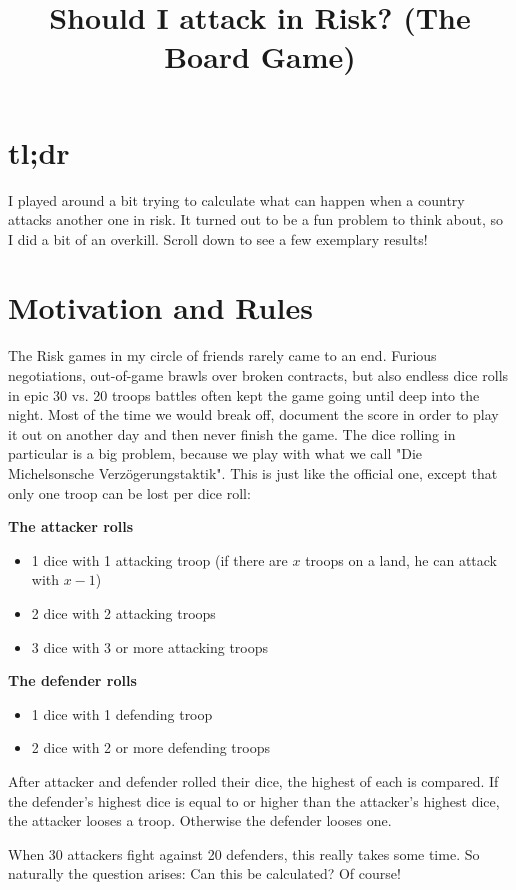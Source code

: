 \documentclass[11pt,a4paper]{article}
\title{Should I attack in Risk? (The Board Game)}
\author{}
\date{}
\begin{document}
\maketitle

\section*{tl;dr}
I played around a bit trying to calculate what can happen when a country attacks another one in risk. It turned out to be a fun problem to think about, so I did a bit of an overkill. Scroll down to see a few exemplary results!

\section{Motivation and Rules}
The Risk games in my circle of friends rarely came to an end. Furious negotiations, out-of-game brawls over broken contracts, but also endless dice rolls in epic 30 vs. 20 troops battles often kept the game going until deep into the night. Most of the time we would break off, document the score in order to play it out on another day and then never finish the game. The dice rolling in particular is a big problem, because we play with what we call "Die Michelsonsche Verzögerungstaktik". This is just like the official one, except that only one troop can be lost per dice roll:

\textbf{The attacker rolls}
\begin{itemize}
\item 1 dice with 1 attacking troop (if there are $x$ troops on a land, he can attack with $x-1$)
\item 2 dice with 2 attacking troops
\item 3 dice with 3 or more attacking troops
\end{itemize}

\textbf{The defender rolls}
\begin{itemize}
\item 1 dice with 1 defending troop
\item 2 dice with 2 or more defending troops
\end{itemize}

After attacker and defender rolled their dice, the highest of each is compared. If the defender's highest dice is equal to or higher than the attacker's highest dice, the attacker looses a troop. Otherwise the defender looses one.

When 30 attackers fight against 20 defenders, this really takes some time. So naturally the question arises: Can this be calculated? Of course!
\end{document}

